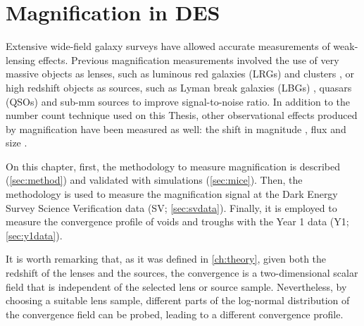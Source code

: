 \chapter{Magnification in DES}
\label{ch:magnification}

Extensive wide-field galaxy surveys have allowed accurate measurements of weak-lensing effects. Previous magnification measurements involved the use of very massive objects as lenses, such as luminous red galaxies (LRGs) and clusters \cite{1995AIPC..336..320B,2014MNRAS.440.3701B,2014MNRAS.439.3755F,2016MNRAS.457.3050C}, or high redshift objects as sources, such as Lyman break galaxies (LBGs) \cite{2009A&A...507..683H,2012MNRAS.426.2489M}, quasars (QSOs) \cite{1979ApJ...227...30S,1989Natur.339..106H,1990A&A...240...11F,1993A&A...268....1B,2002A&A...386..784M,0004-637X-633-2-589} and sub-mm sources  \cite{2011MNRAS.414..596W} to improve signal-to-noise ratio. In addition to the number count technique used on this Thesis, other observational effects produced by magnification have been measured as well: the shift in magnitude \cite{2010MNRAS.405.1025M}, flux \cite{2011MNRAS.411.2113J} and size \cite{2041-8205-780-2-L16}.
\newline

On this chapter, first, the methodology to measure magnification is described (\autoref{sec:method}) and validated with simulations (\autoref{sec:mice}). Then, the methodology is used to measure the magnification signal at the Dark Energy Survey Science Verification data (SV; \autoref{sec:svdata}). Finally, it is employed to measure the convergence profile of voids and troughs with the Year 1 data (Y1; \autoref{sec:y1data}).
\newline

It is worth remarking that, as it was defined in \autoref{ch:theory}, given both the redshift of the lenses and the sources, the convergence is a two-dimensional scalar field that is independent of the selected lens or source sample. Nevertheless, by choosing a suitable lens sample, different parts of the log-normal distribution of the convergence field \cite{2017MNRAS.466.1444C} can be probed, leading to a different convergence profile.

